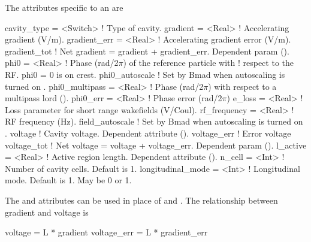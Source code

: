 The attributes specific to an  are 
\begin{example}
  cavity_type     = <Switch>  ! Type of cavity.
  gradient        = <Real>    ! Accelerating gradient (V/m).
  gradient_err    = <Real>    ! Accelerating gradient error (V/m).
  gradient_tot                ! Net gradient = gradient + gradient_err. Dependent param ().
  phi0            = <Real>    ! Phase (rad/2\(\pi\)) of the reference particle with 
                              !   respect to the RF. phi0 = 0 is on crest.
  phi0_autoscale              ! Set by Bmad when autoscaling is turned on .
  phi0_multipass  = <Real>    ! Phase (rad/2\(\pi\)) with respect to a multipass lord ().
  phi0_err        = <Real>    ! Phase error (rad/2\(\pi\))
  e_loss          = <Real>    ! Loss parameter for short range wakefields (V/Coul).
  rf_frequency    = <Real>    ! RF frequency (Hz).
  field_autoscale             ! Set by Bmad when autoscaling is turned on .
  voltage                     ! Cavity voltage. Dependent attribute ().
  voltage_err                 ! Error voltage
  voltage_tot                 ! Net voltage = voltage + voltage_err. Dependent param ().
  l_active        = <Real>    ! Active region length. Dependent attribute ().
  n_cell          = <Int>     ! Number of cavity cells. Default is 1.
  longitudinal_mode = <Int>   ! Longitudinal mode. Default is 1. May be 0 or 1.
\end{example}


The  and  attributes can be used in place of  and .
The relationship between gradient and voltage is
\begin{example}
  voltage     = L * gradient
  voltage_err = L * gradient_err
\end{example}

